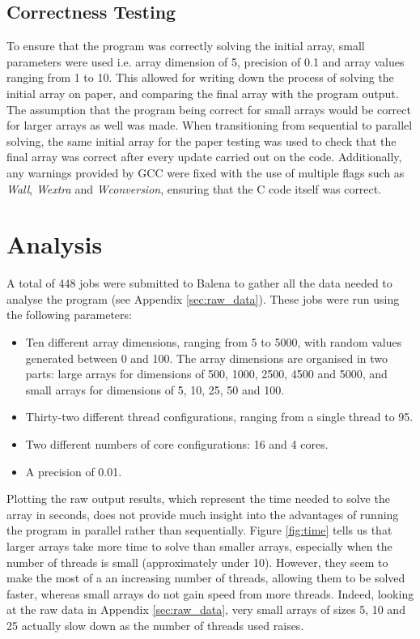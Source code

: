 \documentclass[letterpaper,12pt]{article}
\begin{document}
\subsection{Correctness Testing}

To ensure that the program was correctly solving the initial array, small parameters were used i.e. array dimension of 5, precision of 0.1 and array values ranging from 1 to 10. This allowed for writing down the process of solving the initial array on paper, and comparing the final array with the program output. The assumption that the program being correct for small arrays would be correct for larger arrays as well was made. When transitioning from sequential to parallel solving, the same initial array for the paper testing was used to check that the final array was correct after every update carried out on the code. Additionally, any warnings provided by GCC were fixed with the use of multiple flags such as \textit{Wall}, \textit{Wextra} and \textit{Wconversion}, ensuring that the C code itself was correct.



\section{Analysis}
\label{sec:analysis}

A total of 448 jobs were submitted to Balena to gather all the data needed to analyse the program (see Appendix \ref{sec:raw_data}). These jobs were run using the following parameters:
\begin{itemize}
    \item Ten different array dimensions, ranging from 5 to 5000, with random values generated between 0 and 100. The array dimensions are organised in two parts: large arrays for dimensions of 500, 1000, 2500, 4500 and 5000, and small arrays for dimensions of 5, 10, 25, 50 and 100.
    \item Thirty-two different thread configurations, ranging from a single thread to 95.
    \item Two different numbers of core configurations: 16 and 4 cores.
    \item A precision of 0.01.
\end{itemize}

Plotting the raw output results, which represent the time needed to solve the array in seconds, does not provide much insight into the advantages of running the program in parallel rather than sequentially. Figure \ref{fig:time} tells us that larger arrays take more time to solve than smaller arrays, especially when the number of threads is small (approximately under 10). However, they seem to make the most of a an increasing number of threads, allowing them to be solved faster, whereas small arrays do not gain speed from more threads. Indeed, looking at the raw data in Appendix \ref{sec:raw_data}, very small arrays of sizes 5, 10 and 25 actually slow down as the number of threads used raises.\\
\end{document}
